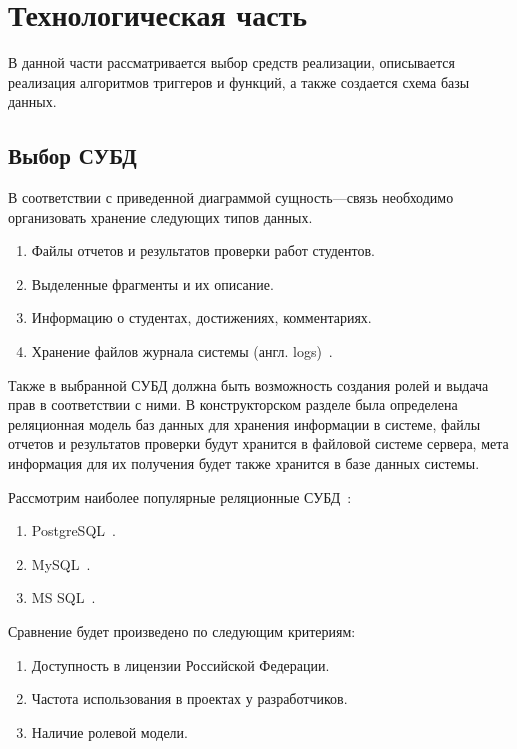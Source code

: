 \chapter{Технологическая часть}
В данной части рассматривается выбор средств реализации, описывается реализация
алгоритмов триггеров и  функций, а также создается схема базы данных.

\section{Выбор СУБД}
В соответствии с приведенной диаграммой сущность---связь необходимо организовать
хранение следующих типов данных.
\begin{enumerate}
	\item Файлы отчетов и результатов проверки работ студентов.
	\item Выделенные фрагменты и их описание.
	\item Информацию о студентах, достижениях, комментариях.
	\item Хранение файлов журнала системы (англ. logs)~\cite{kuznecov-db}.
\end{enumerate}
Также в выбранной СУБД должна быть возможность создания ролей и выдача прав в
соответствии с ними.
В конструкторском разделе была определена реляционная модель баз данных для
хранения информации в системе, файлы отчетов и результатов проверки будут
хранится в файловой системе сервера, мета информация для их получения будет
также хранится в базе данных системы.

Рассмотрим наиболее популярные реляционные СУБД~\cite{sql_popular}:
\begin{enumerate}
	\item PostgreSQL~\cite{postgres,postgres_pro_cert}.
	\item MySQL~\cite{ms_sql_server}.
	\item MS SQL~\cite{mysql}.
\end{enumerate}

Сравнение будет произведено по следующим критериям:
\begin{enumerate}
	\item Доступность в лицензии Российской Федерации.
	\item Частота использования в проектах у разработчиков.
	\item Наличие ролевой модели.
\end{enumerate}


